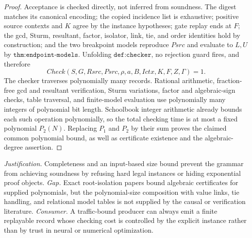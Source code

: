 \documentclass{article}
\begin{document}
\begin{proof}
Acceptance is checked directly, not inferred from soundness.  The digest matches its canonical encoding; the copied incidence list is exhaustive; positive source contexts and \(K\) agree by the instance hypotheses; gate replay ends at \(F\); the gcd, Sturm, resultant, factor, isolator, link, tie, and order identities hold by construction; and the two breakpoint models reproduce \(Psrc\) and evaluate to \(L,U\) by \(\texttt{thm:endpoint-models}\).  Unfolding \(\texttt{def:checker}\), no rejection guard fires, and therefore
\[
 Check(S,G,Rsrc,Psrc,\rho,a,B,Ictx,K,F,Z,\Gamma)=1.
\]
The checker traverses polynomially many records.  Rational arithmetic, fraction-free gcd and resultant verification, Sturm variations, factor and algebraic-sign checks, table traversal, and finite-model evaluation use polynomially many integers of polynomial bit length.  Schoolbook integer arithmetic already bounds each such operation polynomially, so the total checking time is at most a fixed polynomial \(P_2(N)\).  Replacing \(P_1\) and \(P_2\) by their sum proves the claimed common polynomial bound, as well as certificate existence and the algebraic-degree assertion.
\end{proof}
\par\smallskip\noindent \textit{Justification.} Completeness and an input-based size bound prevent the grammar from achieving soundness by refusing hard legal instances or hiding exponential proof objects. \textit{Gap.} Exact root-isolation papers bound algebraic certificates for supplied polynomials, but the polynomial-size composition with value links, tie handling, and relational model tables is not supplied by the causal or verification literature. \textit{Consumer.} A traffic-bound producer can always emit a finite replayable record whose checking cost is controlled by the explicit instance rather than by trust in neural or numerical optimization.
\end{document}
